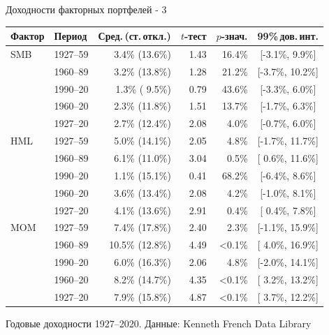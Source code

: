 \documentclass{beamer}
\begin{document}
\begin{frame}{Доходности факторных портфелей - 3}
\centering
\small
\begin{tabular}{l|l|r|r|r|c}
Фактор & Период & Сред.\,(ст.\,откл.) & $t$-тест & $p$-знач. & 99\%\,дов.\,инт.\\ \hline
SMB & 1927--59 &  3.4\% (13.6\%) & 1.43 & 16.4\% & [-3.1\%,  9.9\%] \\    
    & 1960--89 &  3.2\% (13.8\%) & 1.28 & 21.2\% & [-3.7\%, 10.2\%] \\
    & 1990--20 &  1.3\% ( 9.5\%) & 0.79 & 43.6\% & [-3.3\%,  6.0\%] \\    
    & 1960--20 &  2.3\% (11.8\%) & 1.51 & 13.7\% & [-1.7\%,  6.3\%] \\ 
    & 1927--20 &  2.7\% (12.4\%) & 2.08 &  4.0\% & [-0.7\%,  6.0\%] \\    
\hline
HML & 1927--59 &  5.0\% (14.1\%) & 2.05 &  4.8\% & [-1.7\%, 11.7\%] \\    
    & 1960--89 &  6.1\% (11.0\%) & 3.04 &  0.5\% & [ 0.6\%, 11.6\%] \\     
    & 1990--20 &  1.1\% (15.1\%) & 0.41 & 68.2\% & [-6.4\%,  8.6\%] \\    
    & 1960--20 &  3.6\% (13.4\%) & 2.08 &  4.2\% & [-1.0\%,  8.1\%] \\     
    & 1927--20 &  4.1\% (13.6\%) & 2.91 &  0.4\% & [ 0.4\%,  7.8\%] \\      
\hline
MOM & 1927--59 &  7.4\% (17.8\%) & 2.40 &  2.3\% & [-1.1\%, 15.9\%] \\    
    & 1960--89 & 10.5\% (12.8\%) & 4.49 & <0.1\% & [ 4.0\%, 16.9\%] \\ 
    & 1990--20 &  6.0\% (16.3\%) & 2.06 &  4.8\% & [-2.0\%, 14.1\%] \\  
    & 1960--20 &  8.2\% (14.7\%) & 4.35 & <0.1\% & [ 3.2\%, 13.2\%] \\  
    & 1927--20 &  7.9\% (15.8\%) & 4.87 & <0.1\% & [ 3.7\%, 12.2\%] \\  
\hline
\end{tabular}

{\scriptsize Годовые доходности 1927--2020. Данные: Kenneth French Data Library}
\end{frame}



\renewcommand{\addFactorPlot}[3]{
        \addplot[
            color=#2,
            mark=#3,
            line width=1pt,
            mark repeat=120,
            mark phase=36,
            mark options={scale=2}
        ]
        table [
            x = date,
            y = #1,
            col sep=comma
        ]
        {data/fama_french_international_cumulative_growth_data.csv};
    }
\end{document}

